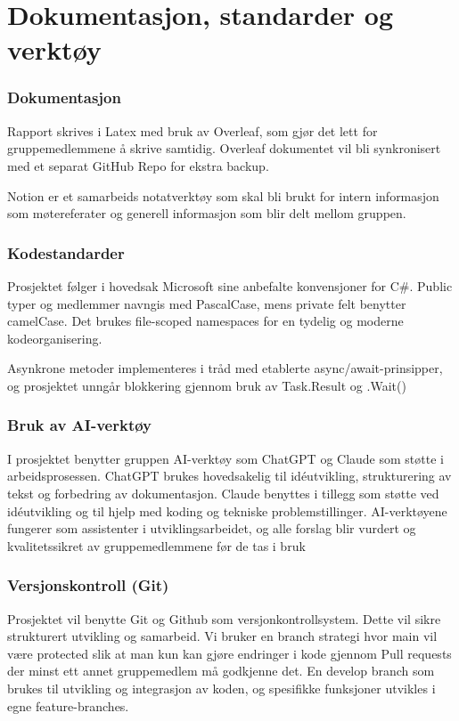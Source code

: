 \section{Dokumentasjon, standarder og verktøy}
\label{sec:teknologivalg}
\subsubsection{Dokumentasjon}
Rapport skrives i Latex med bruk av Overleaf, som gjør det lett for gruppemedlemmene å skrive samtidig. Overleaf dokumentet vil bli synkronisert med et separat GitHub Repo for ekstra backup. 

Notion er et samarbeids notatverktøy som skal bli brukt for intern informasjon som møtereferater og generell informasjon som blir delt mellom gruppen.

\subsubsection{Kodestandarder}
Prosjektet følger i hovedsak Microsoft sine anbefalte konvensjoner for C\#. Public typer og medlemmer navngis med PascalCase, mens private felt benytter camelCase. Det brukes file-scoped namespaces for en tydelig og moderne kodeorganisering.

Asynkrone metoder implementeres i tråd med etablerte async/await-prinsipper, og prosjektet unngår blokkering gjennom bruk av Task.Result og .Wait()

\subsubsection{Bruk av AI-verktøy}

I prosjektet benytter gruppen AI-verktøy som ChatGPT og Claude som støtte i arbeidsprosessen. ChatGPT brukes hovedsakelig til idéutvikling, strukturering av tekst og forbedring av dokumentasjon. Claude benyttes i tillegg som støtte ved idéutvikling og til hjelp med koding og tekniske problemstillinger. AI-verktøyene fungerer som assistenter i utviklingsarbeidet, og alle forslag blir vurdert og kvalitetssikret av gruppemedlemmene før de tas i bruk

\subsubsection{Versjonskontroll (Git)}

Prosjektet vil benytte Git og Github som versjonkontrollsystem. Dette vil sikre strukturert utvikling og samarbeid. Vi bruker en branch strategi hvor main vil være protected slik at man kun kan gjøre endringer i kode gjennom Pull requests der minst ett annet gruppemedlem må godkjenne det. En develop branch som brukes til utvikling og integrasjon av koden, og spesifikke funksjoner utvikles i egne feature-branches.

